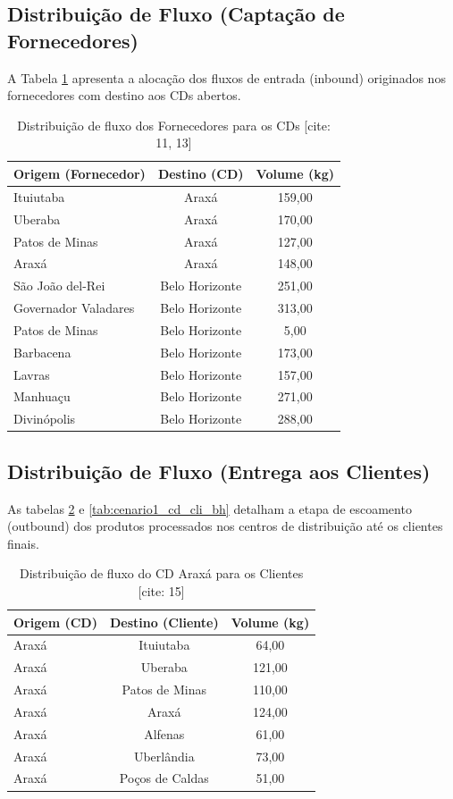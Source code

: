 \documentclass[a4paper,11pt]{article}
\begin{document}
\subsection{Distribuição de Fluxo (Captação de Fornecedores)}

A Tabela \ref{tab:cenario1_forn_cd} apresenta a alocação dos fluxos de entrada (inbound) originados nos fornecedores com destino aos CDs abertos.

\begin{table}[H]
\centering
\begin{tabular}{lcc}
\hline
\textbf{Origem (Fornecedor)} & \textbf{Destino (CD)} & \textbf{Volume (kg)} \\ \hline
Ituiutaba & Araxá & 159,00 \\
Uberaba & Araxá & 170,00 \\
Patos de Minas & Araxá & 127,00 \\
Araxá & Araxá & 148,00 \\
São João del-Rei & Belo Horizonte & 251,00 \\
Governador Valadares & Belo Horizonte & 313,00 \\
Patos de Minas & Belo Horizonte & 5,00 \\
Barbacena & Belo Horizonte & 173,00 \\
Lavras & Belo Horizonte & 157,00 \\
Manhuaçu & Belo Horizonte & 271,00 \\
Divinópolis & Belo Horizonte & 288,00 \\ \hline
\end{tabular}
\caption{Distribuição de fluxo dos Fornecedores para os CDs [cite: 11, 13]}
\label{tab:cenario1_forn_cd}
\end{table}

\subsection{Distribuição de Fluxo (Entrega aos Clientes)}

As tabelas \ref{tab:cenario1_cd_cli_araxa} e \ref{tab:cenario1_cd_cli_bh} detalham a etapa de escoamento (outbound) dos produtos processados nos centros de distribuição até os clientes finais.

\begin{table}[H]
\centering
\begin{tabular}{lcc}
\hline
\textbf{Origem (CD)} & \textbf{Destino (Cliente)} & \textbf{Volume (kg)} \\ \hline
Araxá & Ituiutaba & 64,00 \\
Araxá & Uberaba & 121,00 \\
Araxá & Patos de Minas & 110,00 \\
Araxá & Araxá & 124,00 \\
Araxá & Alfenas & 61,00 \\
Araxá & Uberlândia & 73,00 \\
Araxá & Poços de Caldas & 51,00 \\ \hline
\end{tabular}
\caption{Distribuição de fluxo do CD Araxá para os Clientes [cite: 15]}
\label{tab:cenario1_cd_cli_araxa}
\end{table}
\end{document}
